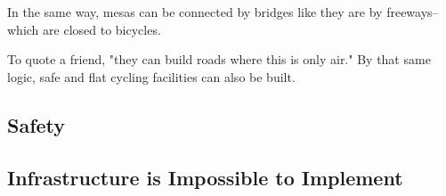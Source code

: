 In the same way, mesas can be connected by bridges like they are by freeways--which are closed to bicycles.

To quote a friend, "they can build roads where this is only air." By that same logic, safe and flat cycling facilities can also be built.

\subsection{Safety} 

\subsection{Infrastructure is Impossible to Implement}

